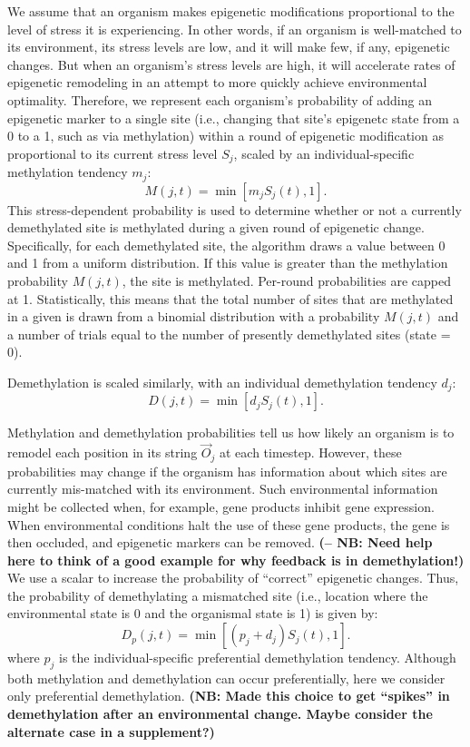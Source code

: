\documentclass{article}
\begin{document}
We assume that an organism makes epigenetic modifications proportional to the level of stress it is experiencing. In other words, if an organism is well-matched to its environment, its stress levels are low, and it will make few, if any, epigenetic changes. But when an organism's stress levels are high, it will accelerate rates of epigenetic remodeling in an attempt to more quickly achieve environmental optimality. Therefore, we represent each organism's probability of adding an epigenetic marker to a single site (i.e., changing that site's epigenetc state from a 0 to a 1, such as via methylation) within a round of epigenetic modification as proportional to its current stress level $S_j$, scaled by an individual-specific methylation tendency $m_j$:
\begin{equation}
    M(j,t) = \min\left[m_jS_j(t),1\right].
\end{equation}
This stress-dependent probability is used to determine whether or not a currently demethylated site is methylated during a given round of epigenetic change. Specifically, for each demethylated site, the algorithm draws a value between 0 and 1 from a uniform distribution. If this value is greater than the methylation probability $M(j,t)$, the site is methylated. Per-round probabilities are capped at 1. Statistically, this means that the total number of sites that are methylated in a given is drawn from a binomial distribution with a probability $M(j,t)$ and a number of trials equal to the number of presently demethylated sites (state = 0). 


Demethylation is scaled similarly, with an individual demethylation tendency $d_j$:
\begin{equation}
    D(j,t) = \min \left[d_jS_j(t),1 \right].
\end{equation}

Methylation and demethylation probabilities tell us how likely an organism is to remodel each position in its string $\vec{O}_j$ at each timestep. However, these probabilities may change if the organism has information about which sites are currently mis-matched with its environment. Such environmental information might be collected when, for example, gene products inhibit gene expression. When environmental conditions halt the use of these gene products, the gene is then occluded, and epigenetic markers can be removed. \textbf{(-- NB: Need help here to think of a good example for why feedback is in demethylation!)} We use a scalar to increase the probability of ``correct'' epigenetic changes. Thus, the probability of demethylating a mismatched site (i.e., location where the environmental state is 0 and the organismal state is 1) is given by:
\begin{equation}
    D_p(j,t) = \min\left[(p_j+d_j)S_j(t),1\right].
\end{equation}
where $p_j$ is the individual-specific preferential demethylation tendency. Although both methylation and demethylation can occur preferentially, here we consider only preferential demethylation. \textbf{(NB: Made this choice to get ``spikes'' in demethylation after an environmental change. Maybe consider the alternate case in a supplement?)}
\end{document}
